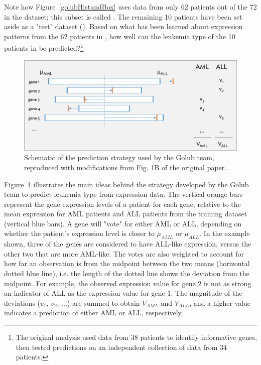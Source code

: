 Note how Figure~\ref{golubHistandBox} uses data from only 62 patients out of the 72 in the  dataset; this subset is called . The remaining 10 patients have been set aside as a "test" dataset (). Based on what has been learned about expression patterns from the 62 patients in , how well can the leukemia type of the 10 patients in  be predicted?\footnote{The original analysis used data from 38 patients to identify informative genes, then tested predictions on an independent collection of data from 34 patients.}

\textD{\newpage}

\begin{figure}[h]
	\centering
	{\includegraphics[width=\textwidth]{ch_intro_to_data_oi_biostat/figures/golubPrediction/golubPrediction.png}
	\caption{Schematic of the prediction strategy used by the Golub team, reproduced with modifications from Fig. 1B of the original paper.
		\label{golubPrediction}}
	}
\end{figure}

Figure~\ref{golubPrediction} illustrates the main ideas behind the strategy developed by the Golub team to predict leukemia type from expression data. The vertical orange bars represent the gene expression levels of a patient for each gene, relative to the mean expression for AML patients and ALL patients from the training dataset (vertical blue bars). A gene will "vote" for either AML or ALL, depending on whether the patient's expression level is closer to $\mu_{AML}$ or $\mu_{ALL}$. In the example shown, three of the genes are considered to have ALL-like expression, versus the other two that are more AML-like. The votes are also weighted to account for how far an observation is from the midpoint between the two means (horizontal dotted blue line), i.e. the length of the dotted line shows the deviation from the midpoint. For example, the observed expression value for gene 2 is not as strong an indicator of ALL as the expression value for gene 1. The magnitude of the deviations ($v_1$, $v_2$, ...) are summed to obtain $V_{AML}$ and $V_{ALL}$, and a higher value indicates a prediction of either AML or ALL, respectively.

